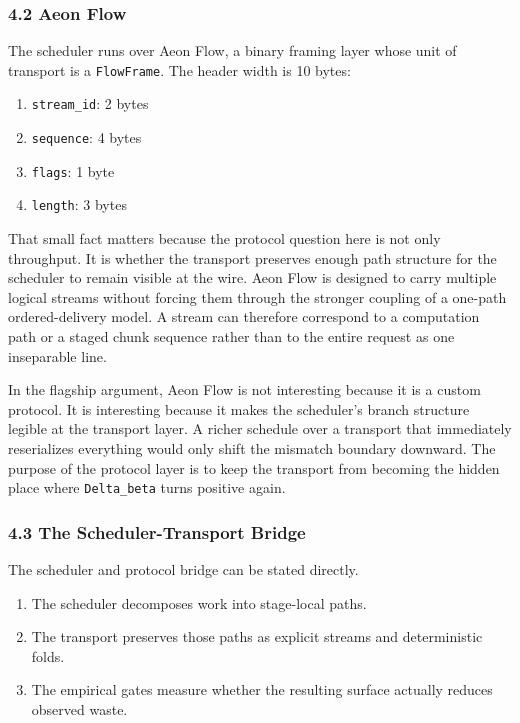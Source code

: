\documentclass[
  11pt,
]{article}
\providecommand{\tightlist}{%
  \setlength{\itemsep}{0pt}\setlength{\parskip}{0pt}}
\begin{document}
\subsubsection{4.2 Aeon Flow}\label{aeon-flow}

The scheduler runs over Aeon Flow, a binary framing layer whose unit of
transport is a \texttt{FlowFrame}. The header width is 10 bytes:

\begin{enumerate}
\def\labelenumi{\arabic{enumi}.}
\tightlist
\item
  \texttt{stream\_id}: 2 bytes
\item
  \texttt{sequence}: 4 bytes
\item
  \texttt{flags}: 1 byte
\item
  \texttt{length}: 3 bytes
\end{enumerate}

That small fact matters because the protocol question here is not only
throughput. It is whether the transport preserves enough path structure
for the scheduler to remain visible at the wire. Aeon Flow is designed
to carry multiple logical streams without forcing them through the
stronger coupling of a one-path ordered-delivery model. A stream can
therefore correspond to a computation path or a staged chunk sequence
rather than to the entire request as one inseparable line.

In the flagship argument, Aeon Flow is not interesting because it is a
custom protocol. It is interesting because it makes the scheduler's
branch structure legible at the transport layer. A richer schedule over
a transport that immediately reserializes everything would only shift
the mismatch boundary downward. The purpose of the protocol layer is to
keep the transport from becoming the hidden place where
\texttt{Delta\_beta} turns positive again.

\subsubsection{4.3 The Scheduler-Transport
Bridge}\label{the-scheduler-transport-bridge}

The scheduler and protocol bridge can be stated directly.

\begin{enumerate}
\def\labelenumi{\arabic{enumi}.}
\tightlist
\item
  The scheduler decomposes work into stage-local paths.
\item
  The transport preserves those paths as explicit streams and
  deterministic folds.
\item
  The empirical gates measure whether the resulting surface actually
  reduces observed waste.
\end{enumerate}
\end{document}

